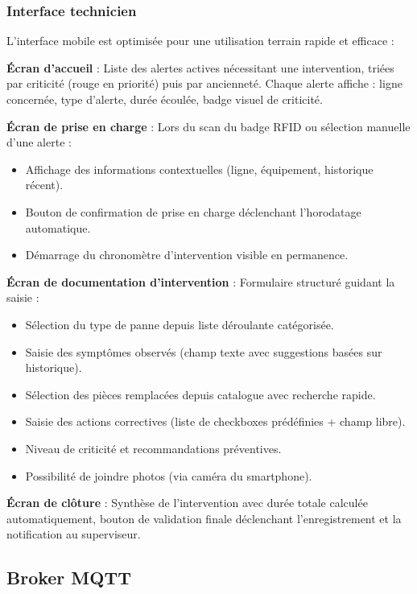 \subsubsection{Interface technicien}

L'interface mobile est optimisée pour une utilisation terrain rapide et efficace :

\textbf{Écran d'accueil} : Liste des alertes actives nécessitant une intervention, triées par criticité (rouge en priorité) puis par ancienneté. Chaque alerte affiche : ligne concernée, type d'alerte, durée écoulée, badge visuel de criticité.

\textbf{Écran de prise en charge} : Lors du scan du badge RFID ou sélection manuelle d'une alerte :

\begin{itemize}
    \item Affichage des informations contextuelles (ligne, équipement, historique récent).
    \item Bouton de confirmation de prise en charge déclenchant l'horodatage automatique.
    \item Démarrage du chronomètre d'intervention visible en permanence.
\end{itemize}

\textbf{Écran de documentation d'intervention} : Formulaire structuré guidant la saisie :

\begin{itemize}
    \item Sélection du type de panne depuis liste déroulante catégorisée.
    \item Saisie des symptômes observés (champ texte avec suggestions basées sur historique).
    \item Sélection des pièces remplacées depuis catalogue avec recherche rapide.
    \item Saisie des actions correctives (liste de checkboxes prédéfinies + champ libre).
    \item Niveau de criticité et recommandations préventives.
    \item Possibilité de joindre photos (via caméra du smartphone).
\end{itemize}

\textbf{Écran de clôture} : Synthèse de l'intervention avec durée totale calculée automatiquement, bouton de validation finale déclenchant l'enregistrement et la notification au superviseur.


\subsection{Broker MQTT}

